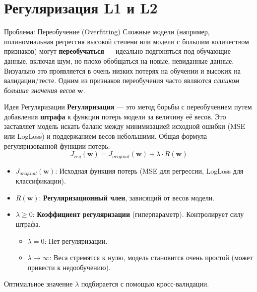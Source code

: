 \section{Регуляризация L1 и L2}

\begin{alerttextbox}{Проблема: Переобучение (Overfitting)}
    Сложные модели (например, полиномиальная регрессия высокой степени или модели с большим количеством признаков) могут \textbf{переобучаться} — идеально подгоняться под обучающие данные, включая шум, но плохо обобщаться на новые, невиданные данные. Визуально это проявляется в очень низких потерях на обучении и высоких на валидации/тесте. Одним из признаков переобучения часто являются \textit{слишком большие значения весов} $\mathbf{w}$.
\end{alerttextbox}

\begin{textbox}{Идея Регуляризации}
    \textbf{Регуляризация} — это метод борьбы с переобучением путем добавления \textbf{штрафа} к функции потерь модели за величину её весов. Это заставляет модель искать баланс между минимизацией исходной ошибки (MSE или LogLoss) и поддержанием весов небольшими.
    Общая формула регуляризованной функции потерь:
    \[ J_{reg}(\mathbf{w}) = J_{original}(\mathbf{w}) + \lambda \cdot R(\mathbf{w}) \]
    \begin{itemize}[nosep, leftmargin=*]
        \item $J_{original}(\mathbf{w})$: Исходная функция потерь (MSE для регрессии, LogLoss для классификации).
        \item $R(\mathbf{w})$: \textbf{Регуляризационный член}, зависящий от весов модели.
        \item $\lambda \ge 0$: \textbf{Коэффициент регуляризации} (гиперпараметр). Контролирует силу штрафа.
            \begin{itemize}[label=\textbullet, nosep]
                \item $\lambda = 0$: Нет регуляризации.
                \item $\lambda \to \infty$: Веса стремятся к нулю, модель становится очень простой (может привести к недообучению).
            \end{itemize}
    \end{itemize}
    Оптимальное значение $\lambda$ подбирается с помощью кросс-валидации.
\end{textbox}

